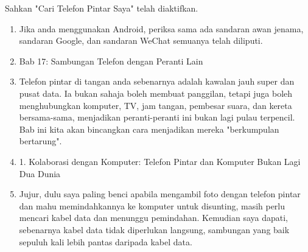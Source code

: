 \begin{tcbpractice}{Sahkan "Cari Telefon Pintar Saya" telah diaktifkan.}
\begin{enumerate}
  \item Jika anda menggunakan Android, periksa sama ada sandaran awan jenama, sandaran Google, dan sandaran WeChat semuanya telah diliputi.
  \item Bab 17: Sambungan Telefon dengan Peranti Lain
  \item Telefon pintar di tangan anda sebenarnya adalah kawalan jauh super dan pusat data. Ia bukan sahaja boleh membuat panggilan, tetapi juga boleh menghubungkan komputer, TV, jam tangan, pembesar suara, dan kereta bersama-sama, menjadikan peranti-peranti ini bukan lagi pulau terpencil. Bab ini kita akan bincangkan cara menjadikan mereka "berkumpulan bertarung".
  \item 1. Kolaborasi dengan Komputer: Telefon Pintar dan Komputer Bukan Lagi Dua Dunia
  \item Jujur, dulu saya paling benci apabila mengambil foto dengan telefon pintar dan mahu memindahkannya ke komputer untuk disunting, masih perlu mencari kabel data dan menunggu pemindahan. Kemudian saya dapati, sebenarnya kabel data tidak diperlukan langsung, sambungan yang baik sepuluh kali lebih pantas daripada kabel data.
\end{enumerate}

\end{tcbpractice}
